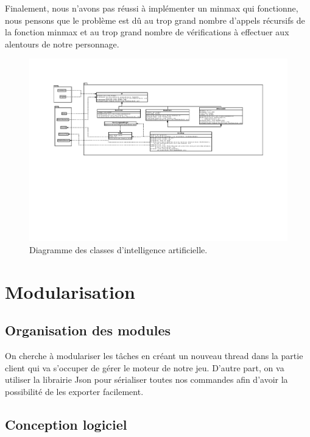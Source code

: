 \documentclass[a4paper,12pt]{article}
\begin{document}
Finalement, nous n'avons pas réussi à implémenter un minmax qui fonctionne, nous pensons que le problème est dû au trop grand nombre d'appels récursifs de la fonction minmax et au trop grand nombre de vérifications à effectuer aux alentours de notre personnage.

\begin{landscape}
\begin{figure}[p]
\includegraphics[width=0.9\paperheight]{ai.pdf}
\caption{\label{uml:ai}Diagramme des classes d'intelligence artificielle.} 
\end{figure}
\end{landscape}


\section{Modularisation}
\label{sec:module}

\subsection{Organisation des modules}

On cherche à modulariser les tâches en créant un nouveau thread dans la partie client qui va s'occuper de gérer le moteur de notre jeu.
D'autre part, on va utiliser la librairie Json pour sérialiser toutes nos commandes afin d'avoir la possibilité de les exporter facilement.

\subsection{Conception logiciel}
\end{document}
